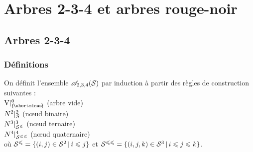 \section{Arbres 2-3-4 et arbres rouge-noir}

	
	\subsection{Arbres 2-3-4}
	
		\subsubsection{Définitions}
			
			\begin{Definition}
				On définit l'ensemble \(\AdtqS\) par induction à partir des règles de construction suivantes : \\
					 \bdot \(\V\constr{0}{\noset}\) (arbre vide) \\
					 \bdot \(\N^2\constr{2}{\cal{S}}\) (n\oe ud binaire) \\
					 \bdot \(\N^3\constr{3}{\cal{S}^\leqslant}\) (n\oe ud ternaire) \\
					 \bdot \(\N^4\constr{4}{\cal{S}^{\leqslant\leqslant}}\) (n\oe ud quaternaire) \\[1mm]
				où \(\cal{S}^\leqslant = \{(i,j)\in\cal{S}^2\,|\, i\leqslant j\}\) et \(\cal{S}^{\leqslant\leqslant} = \{(i,j,k)\in\cal{S}^3\,|\, i\leqslant j\leqslant k\}\).
			\end{Definition}
			
